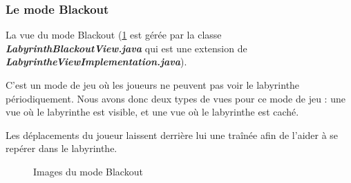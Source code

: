 \subsubsection*{Le mode Blackout}

La vue du mode Blackout (\ref{fig:BlackoutModeLabyrinth} est gérée par la classe \textbf{\textit{LabyrinthBlackoutView.java}} qui est une extension de \textbf{\textit{LabyrintheViewImplementation.java}}).

C'est un mode de jeu où les joueurs ne peuvent pas voir le labyrinthe périodiquement. Nous avons donc deux types de vues pour ce mode de jeu : une vue où le labyrinthe est visible, et une vue où le labyrinthe est caché.

Les déplacements du joueur laissent derrière lui une traînée afin de l'aider à se repérer dans le labyrinthe.

\begin{figure}[!htb]%
    \centering
    \qquad
    \qquad
    \caption{Images du mode Blackout}%
    \label{fig:BlackoutModeLabyrinth}
\end{figure}
\FloatBarrier

